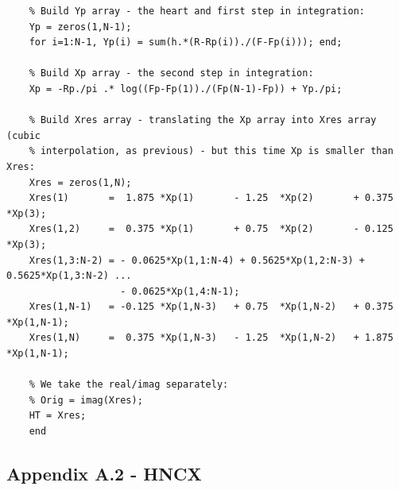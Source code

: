 \documentclass[12pt,twoside,a4paper]{article}
\numberwithin{equation}{subsection}
\numberwithin{figure}{subsection}
\begin{document}
\begin{lstlisting}
    % Build Yp array - the heart and first step in integration:
    Yp = zeros(1,N-1);
    for i=1:N-1, Yp(i) = sum(h.*(R-Rp(i))./(F-Fp(i))); end;

    % Build Xp array - the second step in integration:
    Xp = -Rp./pi .* log((Fp-Fp(1))./(Fp(N-1)-Fp)) + Yp./pi;

    % Build Xres array - translating the Xp array into Xres array (cubic
    % interpolation, as previous) - but this time Xp is smaller than Xres:
    Xres = zeros(1,N);
    Xres(1)       =  1.875 *Xp(1)       - 1.25  *Xp(2)       + 0.375 *Xp(3);
    Xres(1,2)     =  0.375 *Xp(1)       + 0.75  *Xp(2)       - 0.125 *Xp(3);
    Xres(1,3:N-2) = - 0.0625*Xp(1,1:N-4) + 0.5625*Xp(1,2:N-3) + 0.5625*Xp(1,3:N-2) ...
                    - 0.0625*Xp(1,4:N-1);
    Xres(1,N-1)   = -0.125 *Xp(1,N-3)   + 0.75  *Xp(1,N-2)   + 0.375 *Xp(1,N-1);
    Xres(1,N)     =  0.375 *Xp(1,N-3)   - 1.25  *Xp(1,N-2)   + 1.875 *Xp(1,N-1);

    % We take the real/imag separately:
    % Orig = imag(Xres);
    HT = Xres;
	end
\end{lstlisting}
\subsection*{Appendix A.2 - HNCX}
\end{document}
